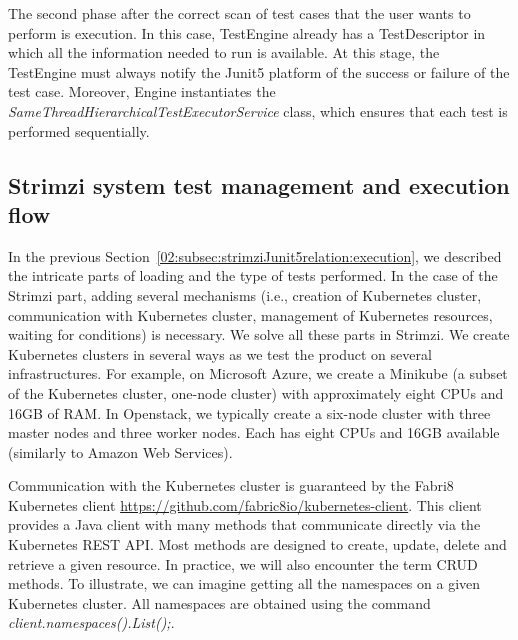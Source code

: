 The second phase after the correct scan of test cases that the user wants to perform is execution.
In this case, TestEngine already has a TestDescriptor in which all the information needed to run is available.
At this stage, the TestEngine must always notify the Junit5 platform of the success or failure of the test case.
Moreover, Engine instantiates the \emph{SameThreadHierarchicalTestExecutorService} class, which ensures that each test is performed sequentially.

\subsection{Strimzi system test management and execution flow}
\label{02:subsec:strimzisystemtestsexecution}

In the previous Section~\ref{02:subsec:strimziJunit5relation:execution}, we described the intricate parts of loading and the type of tests performed.
In the case of the Strimzi part, adding several mechanisms (i.e., creation of Kubernetes cluster, communication with Kubernetes cluster, management of Kubernetes resources, waiting for conditions) is necessary.
We solve all these parts in Strimzi.
We create Kubernetes clusters in several ways as we test the product on several infrastructures.
For example, on Microsoft Azure, we create a Minikube (a subset of the Kubernetes cluster, one-node cluster) with approximately eight CPUs and 16GB of RAM. In Openstack, we typically create a six-node cluster with three master nodes and three worker nodes.
Each has eight CPUs and 16GB available (similarly to Amazon Web Services).

Communication with the Kubernetes cluster is guaranteed by the Fabri8 Kubernetes client \url {https://github.com/fabric8io/kubernetes-client}.
This client provides a Java client with many methods that communicate directly via the Kubernetes REST API.
Most methods are designed to create, update, delete and retrieve a given resource.
In practice, we will also encounter the term CRUD methods.
To illustrate, we can imagine getting all the namespaces on a given Kubernetes cluster.
All namespaces are obtained using the command \emph{client.namespaces().List();}.

